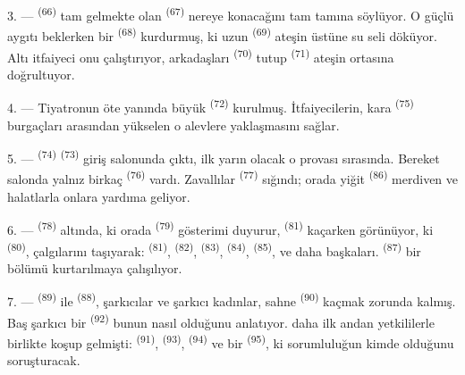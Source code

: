 3. ---  \textsuperscript{(66)} tam gelmekte olan
 \textsuperscript{(67)} nereye konacağını tam tamına
söylüyor. O güçlü aygıtı beklerken bir 
\textsuperscript{(68)} kurdurmuş, ki uzun 
\textsuperscript{(69)} ateşin üstüne su seli döküyor. Altı itfaiyeci onu
çalıştırıyor, arkadaşları  \textsuperscript{(70)} tutup
 \textsuperscript{(71)} ateşin ortasına doğrultuyor.

4. --- Tiyatronun öte yanında büyük  \textsuperscript{(72)}
kurulmuş. İtfaiyecilerin, kara  \textsuperscript{(75)}
burgaçları arasından yükselen o alevlere yaklaşmasını sağlar.

\VUsaut{5.0mm}
\VUsaut{3.4mm}

5. ---  \textsuperscript{(74)} 
\textsuperscript{(73)} giriş salonunda çıktı, ilk  yarın
olacak o  provası sırasında. Bereket salonda yalnız birkaç
 \textsuperscript{(76)} vardı. Zavallılar 
\textsuperscript{(77)} sığındı; orada yiğit 
\textsuperscript{(86)} merdiven ve halatlarla onlara yardıma geliyor.

6. ---  \textsuperscript{(78)} altında, ki orada
 \textsuperscript{(79)} gösterimi duyurur,
 \textsuperscript{(81)} kaçarken görünüyor, ki
 \textsuperscript{(80)}, çalgılarını taşıyarak:
 \textsuperscript{(81)},  \textsuperscript{(82)},
 \textsuperscript{(83)}, 
\textsuperscript{(84)},  \textsuperscript{(85)}, ve daha
başkaları.  \textsuperscript{(87)} bir bölümü kurtarılmaya
çalışılıyor.

7. ---  \textsuperscript{(89)} ile 
\textsuperscript{(88)}, şarkıcılar ve şarkıcı kadınlar, sahne
 \textsuperscript{(90)} kaçmak zorunda kalmış. Baş
şarkıcı bir  \textsuperscript{(92)} bunun nasıl
olduğunu anlatıyor.  daha ilk andan yetkililerle birlikte
koşup gelmişti:  \textsuperscript{(91)},  \textsuperscript{(93)}, 
\textsuperscript{(94)} ve bir  \textsuperscript{(95)}, ki
sorumluluğun kimde olduğunu soruşturacak.
\VUsaut{6.0mm}
\VUfilet{22mm}
